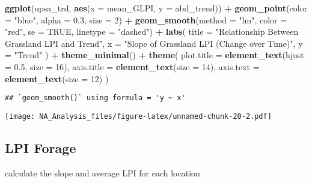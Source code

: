\documentclass[
]{article}
\newenvironment{Shaded}{\begin{snugshade}}{\end{snugshade}}
\newcommand{\AttributeTok}[1]{\textcolor[rgb]{0.13,0.29,0.53}{#1}}
\newcommand{\ConstantTok}[1]{\textcolor[rgb]{0.56,0.35,0.01}{#1}}
\newcommand{\DecValTok}[1]{\textcolor[rgb]{0.00,0.00,0.81}{#1}}
\newcommand{\FloatTok}[1]{\textcolor[rgb]{0.00,0.00,0.81}{#1}}
\newcommand{\FunctionTok}[1]{\textcolor[rgb]{0.13,0.29,0.53}{\textbf{#1}}}
\newcommand{\NormalTok}[1]{#1}
\newcommand{\SpecialCharTok}[1]{\textcolor[rgb]{0.81,0.36,0.00}{\textbf{#1}}}
\newcommand{\StringTok}[1]{\textcolor[rgb]{0.31,0.60,0.02}{#1}}
\begin{document}
\begin{Shaded}
\begin{Highlighting}[]
\FunctionTok{ggplot}\NormalTok{(upsa\_trd, }\FunctionTok{aes}\NormalTok{(}\AttributeTok{x =}\NormalTok{ mean\_GLPI, }\AttributeTok{y =}\NormalTok{ abd\_trend)) }\SpecialCharTok{+}
  \FunctionTok{geom\_point}\NormalTok{(}\AttributeTok{color =} \StringTok{"blue"}\NormalTok{, }\AttributeTok{alpha =} \FloatTok{0.3}\NormalTok{, }\AttributeTok{size =} \DecValTok{2}\NormalTok{) }\SpecialCharTok{+}  
  \FunctionTok{geom\_smooth}\NormalTok{(}\AttributeTok{method =} \StringTok{"lm"}\NormalTok{, }\AttributeTok{color =} \StringTok{"red"}\NormalTok{, }\AttributeTok{se =} \ConstantTok{TRUE}\NormalTok{, }\AttributeTok{linetype =} \StringTok{"dashed"}\NormalTok{) }\SpecialCharTok{+} 
  \FunctionTok{labs}\NormalTok{(}
    \AttributeTok{title =} \StringTok{"Relationship Between Grassland LPI and Trend"}\NormalTok{,}
    \AttributeTok{x =} \StringTok{"Slope of Grassland LPI (Change over Time)"}\NormalTok{,}
    \AttributeTok{y =} \StringTok{"Trend"}
\NormalTok{  ) }\SpecialCharTok{+}
  \FunctionTok{theme\_minimal}\NormalTok{() }\SpecialCharTok{+}
  \FunctionTok{theme}\NormalTok{(}
    \AttributeTok{plot.title =} \FunctionTok{element\_text}\NormalTok{(}\AttributeTok{hjust =} \FloatTok{0.5}\NormalTok{, }\AttributeTok{size =} \DecValTok{16}\NormalTok{),}
    \AttributeTok{axis.title =} \FunctionTok{element\_text}\NormalTok{(}\AttributeTok{size =} \DecValTok{14}\NormalTok{),}
    \AttributeTok{axis.text =} \FunctionTok{element\_text}\NormalTok{(}\AttributeTok{size =} \DecValTok{12}\NormalTok{)}
\NormalTok{  )}
\end{Highlighting}
\end{Shaded}

\begin{verbatim}
## `geom_smooth()` using formula = 'y ~ x'
\end{verbatim}

\texttt{[image: NA\_Analysis\_files/figure-latex/unnamed-chunk-20-2.pdf]}

\subsection{LPI Forage}\label{lpi-forage}

calculate the slope and average LPI for each location
\end{document}
